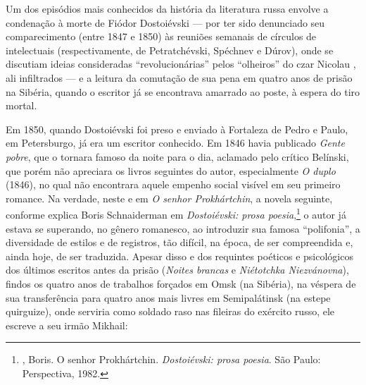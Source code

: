 \label{longaprovacao}

Um dos episódios mais conhecidos da história da literatura russa envolve a
condenação à morte de Fiódor Dostoiévski --- por ter sido
denunciado seu comparecimento (entre 1847 e 1850) às reuniões
semanais de círculos de intelectuais (respectivamente, de
Petratchévski, Spéchnev e Dúrov), onde se discutiam ideias
consideradas ``revolucionárias'' pelos ``olheiros'' do czar
Nicolau , ali infiltrados --- e a leitura da
comutação de sua pena em quatro anos de prisão na Sibéria,
quando o escritor já se encontrava amarrado ao poste,
à espera do tiro mortal.

Em 1850, quando Dostoiévski foi preso e enviado à Fortaleza de
Pedro e Paulo, em Petersburgo, já era um escritor conhecido. Em
1846 havia publicado \emph{Gente pobre}, que o tornara famoso
da noite para o dia, aclamado pelo crítico Belínski, que porém
não apreciara os livros seguintes do autor, especialmente \emph{O
duplo} (1846), no qual não encontrara aquele empenho social
visível em seu primeiro romance. Na verdade, neste e em
\emph{O senhor Prokhártchin}, a novela seguinte, conforme
explica Boris Schnaiderman em \emph{Dostoiévski:
prosa poesia},\footnote{, Boris. O senhor Prokhártchin. \emph{Dostoiévski: prosa poesia}. São Paulo: Perspectiva, 1982.} o autor já estava se superando,
no gênero romanesco, ao introduzir sua famosa ``polifonia'', a
diversidade de estilos e de registros, tão difícil, na época,
de ser compreendida e, ainda hoje, de ser traduzida. Apesar
disso e dos requintes poéticos e psicológicos dos últimos
escritos antes da prisão (\emph{Noites brancas} e
\emph{Niétotchka Niezvánovna}), findos os quatro anos de
trabalhos forçados em Omsk (na Sibéria), na véspera de
sua transferência para quatro anos mais livres em
Semipalátinsk (na estepe quirguize), onde serviria como soldado
raso nas fileiras do exército russo, ele escreve a seu irmão
Mikhail: 

